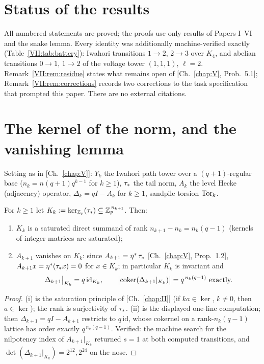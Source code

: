 \section*{Status of the results}

All numbered statements are proved; the proofs use only results of Papers I--VI and
the snake lemma. Every identity was additionally machine-verified exactly
(Table~\ref{VII:tab:battery}): Iwahori transitions $1\to2$, $2\to3$ over $K_4$, and
abelian transitions $0\to1$, $1\to2$ of the voltage tower $(1,1,1)$, $\ell=2$.
Remark~\ref{VII:rem:residue} states what remains open of [Ch.~\ref{chap:V}, Prob.~5.1];
Remark~\ref{VII:rem:corrections} records two corrections to the task specification that
prompted this paper. There are no external citations.

\section{The kernel of the norm, and the vanishing lemma}\label{VII:sec:kernel}

Setting as in [Ch.~\ref{chap:V}]: $Y_k$ the Iwahori path tower over a $(q+1)$-regular base
($n_k=n(q+1)q^{k-1}$ for $k\ge1$), $\tau_*$ the tail norm, $A_k$ the level Hecke
(adjacency) operator, $\Delta_k=qI-A_k$ for $k\ge1$, sandpile torsion
$\operatorname{Tor}_k$.

\begin{lemma}\label{VII:lem:vanish}
For $k\ge1$ let $K_k:=\ker_{\mathbb{Z}_p}(\tau_*)\subseteq\mathbb{Z}_p^{\,n_{k+1}}$. Then:
\begin{enumerate}
\item[(i)] $K_k$ is a saturated direct summand of rank $n_{k+1}-n_k=n_k(q-1)$
(kernels of integer matrices are saturated);
\item[(ii)] $A_{k+1}$ vanishes on $K_k$: since $A_{k+1}=\eta^*\,\tau_*$
{\rm[Ch.~\ref{chap:V}, Prop.~1.2]}, $A_{k+1}x=\eta^*(\tau_* x)=0$ for $x\in K_k$; in particular $K_k$
is invariant and
\[
\Delta_{k+1}\big|_{K_k}=q\,\mathrm{id}_{K_k},
\qquad
\bigl|\coker(\Delta_{k+1}|_{K_k})\bigr|=q^{\,n_k(q-1)}\ \text{exactly.}
\]
\end{enumerate}
\end{lemma}

\begin{proof}
(i) is the saturation principle of [Ch.~\ref{chap:II}] (if $ka\in\ker$, $k\neq0$, then
$a\in\ker$); the rank is surjectivity of $\tau_*$. (ii) is the displayed one-line
computation; then $\Delta_{k+1}=qI-A_{k+1}$ restricts to $q\,\mathrm{id}$, whose
cokernel on a rank-$n_k(q-1)$ lattice has order exactly $q^{\,n_k(q-1)}$. Verified:
the machine search for the nilpotency index of $A_{k+1}|_{K_k}$ returned $s=1$ at
both computed transitions, and $\det(\Delta_{k+1}|_{K_k})=2^{12},2^{24}$ on the
nose.
\end{proof}

